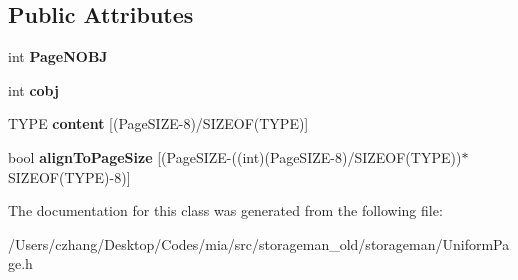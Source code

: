 \subsection*{Public Attributes}
\begin{DoxyCompactItemize}
\item 
\hypertarget{classmia_1_1sm_1_1_uniform_page_ac8ded3984b8229ce43107757fa65b1b3}{int {\bfseries Page\-N\-O\-B\-J}}\label{classmia_1_1sm_1_1_uniform_page_ac8ded3984b8229ce43107757fa65b1b3}

\item 
\hypertarget{classmia_1_1sm_1_1_uniform_page_a8800bc6de11955973a08647a7f594a26}{int {\bfseries cobj}}\label{classmia_1_1sm_1_1_uniform_page_a8800bc6de11955973a08647a7f594a26}

\item 
\hypertarget{classmia_1_1sm_1_1_uniform_page_a3a9679234f5ab08fd13ebd13f1df8def}{T\-Y\-P\-E {\bfseries content} \mbox{[}(Page\-S\-I\-Z\-E-\/8)/S\-I\-Z\-E\-O\-F(T\-Y\-P\-E)\mbox{]}}\label{classmia_1_1sm_1_1_uniform_page_a3a9679234f5ab08fd13ebd13f1df8def}

\item 
\hypertarget{classmia_1_1sm_1_1_uniform_page_a6fa558e53ca096e2ed7eaa1ee6eafde7}{bool {\bfseries align\-To\-Page\-Size} \mbox{[}(Page\-S\-I\-Z\-E-\/((int)(Page\-S\-I\-Z\-E-\/8)/S\-I\-Z\-E\-O\-F(T\-Y\-P\-E))$\ast$S\-I\-Z\-E\-O\-F(T\-Y\-P\-E)-\/8)\mbox{]}}\label{classmia_1_1sm_1_1_uniform_page_a6fa558e53ca096e2ed7eaa1ee6eafde7}

\end{DoxyCompactItemize}


The documentation for this class was generated from the following file\-:\begin{DoxyCompactItemize}
\item 
/\-Users/czhang/\-Desktop/\-Codes/mia/src/storageman\-\_\-old/storageman/Uniform\-Page.\-h\end{DoxyCompactItemize}
